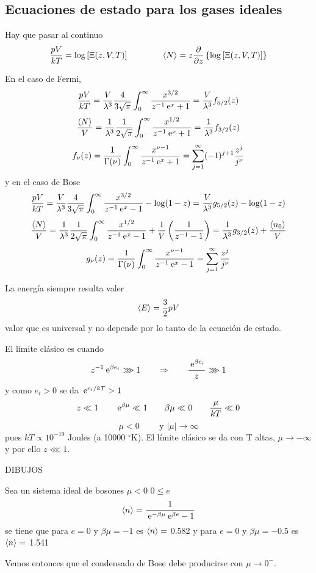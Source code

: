 \documentclass[10pt,oneside]{CBFT_book}
\begin{document}
\subsection{Ecuaciones de estado para los gases ideales}

Hay que pasar al continuo
\[
	\frac{pV}{kT} = \log \left[ \Xi (z,V,T) \right] \qquad \qquad 
	\braket{N} = z\frac{\partial^{\hspace{-0.05em}} {}}{\partial {z}^{\hspace{-0.05em}}}\left\{ \log \left[ \Xi (z,V,T) \right] \right\}
\]

En el caso de Fermi,
\[
	\frac{pV}{kT} = \frac{V}{\lambda^3} \frac{4}{3\sqrt{\pi}} \int_0^\infty 
	\frac{x^{3/2}}{z^{-1}\:\mathrm{e}^x + 1} = \frac{V}{\lambda^3} f_{5/2}(z)
\]
\[
	\frac{\braket{N}}{V} = \frac{1}{\lambda^3} \frac{1}{2\sqrt{\pi}} \int_0^\infty 
	\frac{x^{1/2}}{z^{-1}\:\mathrm{e}^x + 1} = \frac{1}{\lambda^3} f_{3/2}(z)
\]
\[
	f_\nu(z) = \frac{1}{\Gamma(\nu)} \int_0^\infty \frac{x^{\nu - 1}}{z^{-1}\:\mathrm{e}^x + 1} =
	\sum_{j=1}^\infty (-1)^{j+1} \frac{z^j}{j^\nu}
\]
y en el caso de Bose
\[
	\frac{pV}{kT} = \frac{V}{\lambda^3} \frac{4}{3\sqrt{\pi}} \int_0^\infty 
	\frac{x^{3/2}}{z^{-1}\:\mathrm{e}^x - 1} - \log ( 1 - z ) = 
	\frac{V}{\lambda^3} g_{5/2}(z) - \log ( 1 - z )
\]
\[
	\frac{\braket{N}}{V} = \frac{1}{\lambda^3} \frac{1}{2\sqrt{\pi}} \int_0^\infty 
	\frac{x^{1/2}}{z^{-1}\:\mathrm{e}^x - 1} + \frac{1}{V} \left( \frac{ 1 }{ z^{-1} - 1 } \right) = 
	\frac{1}{\lambda^3} g_{3/2}(z) + \frac{\braket{n_0}}{V}
\]
\[
	g_\nu(z) = \frac{1}{\Gamma(\nu)} \int_0^\infty \frac{x^{\nu - 1}}{z^{-1}\:\mathrm{e}^x - 1} =
	\sum_{j=1}^\infty \frac{z^j}{j^\nu}
\]



La energía siempre resulta valer
\[
	\braket{E} = \frac{3}{2}pV
\]
valor que es universal y no depende por lo tanto de la ecuación de estado.

El límite clásico es cuando 
\[
	z^{-1}\:\mathrm{e}^{\beta e_i} \ggg 1 \qquad \Rightarrow \qquad \frac{\:\mathrm{e}^{\beta e_i}}{z} \ggg 1
\]
y como $ e_i > 0 $ se da $ \:\mathrm{e}^{e_i/kT} > 1 $
\[
	z \ll 1 \qquad \:\mathrm{e}^{\beta\mu} \ll 1 \qquad \beta\mu \ll 0 \qquad \frac{\mu}{kT} \ll 0
\]
\[
	\mu < 0 \qquad \text{ y } |\mu| \to \infty 
\]
pues $ kT \propto 10^{-19} $ Joules (a 10000 $^\circ$K).
El límite clásico se da con T altas, $ \mu \to -\infty $ y por ello $ z \lll 1$.

DIBUJOS

Sea un sistema ideal de bosones $ \mu < 0 $ $ 0 \leq e $
\[
	\braket{n} = \frac{1}{ \:\mathrm{e}^{-\beta\mu} \:\mathrm{e}^{\beta e} - 1 }
\]
se tiene que para $ e=0 $ y $ \beta\mu = -1 $ es $ \braket{n} = $ 0.582 y para $ e=0 $ y $ \beta\mu = -0.5 $
es $ \braket{n} = $ 1.541

Vemos entonces que el condensado de Bose debe producirse con $ \mu \to 0^{-}$.


\end{document}
